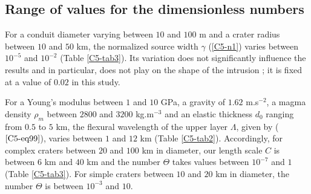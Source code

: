 	
\subsection{Range of values for the dimensionless numbers}
\label{C5-Dimensionless_Number}
	 
For a conduit  diameter varying between $10$ and $100$  m and a crater
radius between $10$ and $50$  km, the normalized source width $\gamma$
(\ref{C5-n1})   varies   between   $10^{-5}$  and   $10^{-2}$   (Table
\ref{C5-tab3}).  Its  variation does  not significantly  influence the
results and in particular, does not play on the shape of the intrusion
\citep{Michaut:2011kg} ;  it is  fixed at  a value  of $0.02$  in this
study. 

For  a Young's modulus between  $1$ and $10$ GPa,  a gravity of
$1.62$ m.s$^{-2}$, a magma density  $\rho_m$ between $2800$ and $3200$
kg.m$^{-3}$ and an elastic thickness $d_0$ ranging from $0.5$ to $5$
km, the  flexural wavelength  of the upper  layer $\Lambda$,  given by
($\ref{C5-eq99}$),   varies   between   $1$   and   $12$   km   (Table
\ref{C5-tab2}).   Accordingly, for  complex craters  between $20$  and
$100$ km in diameter, our length scale  $C$ is between $6$ km and $40$
km  and the  number $\Theta$  takes values  between $10^{-7}$  and $1$
(Table \ref{C5-tab3}).  For simple craters between $10$ and $20$ km in
diameter, the number $\Theta$ is between $10^{-3}$ and $10$.

